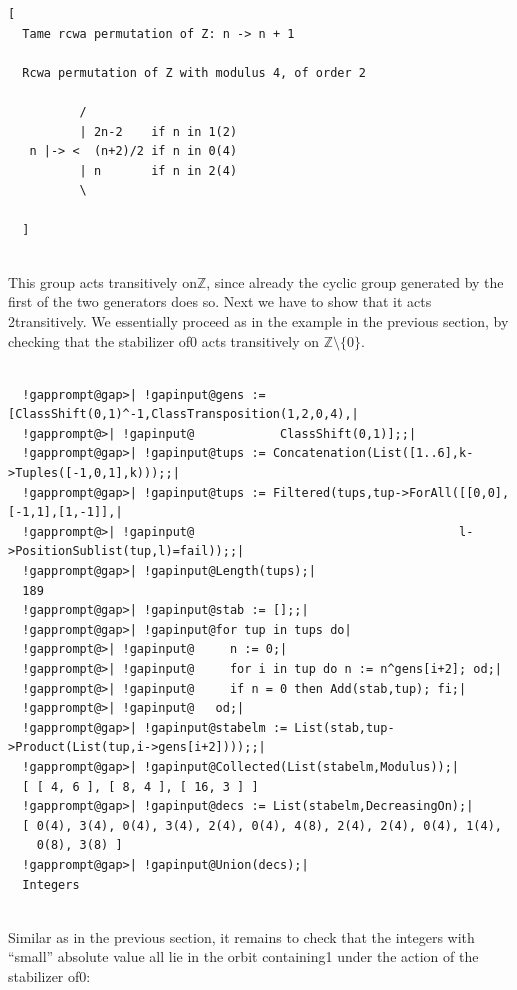 \documentclass[a4paper,11pt]{report}
\begin{document}
{{\begin{Verbatim}[commandchars=!@A,fontsize=\small,frame=single,label=Example]
  [
  Tame rcwa permutation of Z: n -> n + 1
  
  Rcwa permutation of Z with modulus 4, of order 2
  
          /
          | 2n-2    if n in 1(2)
   n |-> <  (n+2)/2 if n in 0(4)
          | n       if n in 2(4)
          \
  
  ]
  
\end{Verbatim}
 This group acts transitively on{\nobreakspace}{\ensuremath{\mathbb Z}}, since
already the cyclic group generated by the first of the two generators does so.
Next we have to show that it acts 2\texttt{}transitively. We
essentially proceed as in the example in the previous section, by checking
that the stabilizer of{\nobreakspace}0 acts transitively on ${\ensuremath{\mathbb Z}} \setminus \{0\}$. 
\begin{Verbatim}[commandchars=!@|,fontsize=\small,frame=single,label=Example]
  
  !gapprompt@gap>| !gapinput@gens := [ClassShift(0,1)^-1,ClassTransposition(1,2,0,4),|
  !gapprompt@>| !gapinput@            ClassShift(0,1)];;|
  !gapprompt@gap>| !gapinput@tups := Concatenation(List([1..6],k->Tuples([-1,0,1],k)));;|
  !gapprompt@gap>| !gapinput@tups := Filtered(tups,tup->ForAll([[0,0],[-1,1],[1,-1]],|
  !gapprompt@>| !gapinput@                                     l->PositionSublist(tup,l)=fail));;|
  !gapprompt@gap>| !gapinput@Length(tups);|
  189
  !gapprompt@gap>| !gapinput@stab := [];;|
  !gapprompt@gap>| !gapinput@for tup in tups do|
  !gapprompt@>| !gapinput@     n := 0;|
  !gapprompt@>| !gapinput@     for i in tup do n := n^gens[i+2]; od;|
  !gapprompt@>| !gapinput@     if n = 0 then Add(stab,tup); fi;|
  !gapprompt@>| !gapinput@   od;|
  !gapprompt@gap>| !gapinput@stabelm := List(stab,tup->Product(List(tup,i->gens[i+2])));;|
  !gapprompt@gap>| !gapinput@Collected(List(stabelm,Modulus));|
  [ [ 4, 6 ], [ 8, 4 ], [ 16, 3 ] ]
  !gapprompt@gap>| !gapinput@decs := List(stabelm,DecreasingOn);|
  [ 0(4), 3(4), 0(4), 3(4), 2(4), 0(4), 4(8), 2(4), 2(4), 0(4), 1(4), 
    0(8), 3(8) ]
  !gapprompt@gap>| !gapinput@Union(decs);|
  Integers
  
\end{Verbatim}
 Similar as in the previous section, it remains to check that the integers with ``small'' absolute value all lie in the orbit containing{\nobreakspace}1 under the
action of the stabilizer of{\nobreakspace}0: 
\begin{Verbatim}[commandchars=@|B,fontsize=\small,frame=single,label=Example]
  

\end{Verbatim}}}
\end{document}
